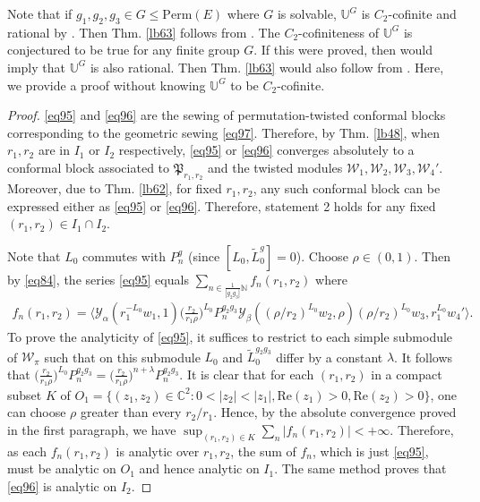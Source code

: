\documentclass[11pt,b5paper,notitlepage]{article}
\theoremstyle{definition}
\theoremstyle{plain}
\newcommand{\fk}{\mathfrak}
\newcommand{\mc}{\mathcal}
\newcommand{\wtd}{\widetilde}
\newcommand{\bk}[1]{\langle {#1}\rangle}
\newcommand{\Ubb}{\mathbb U}
\newcommand{\Cbb}{\mathbb C}
\newcommand{\Nbb}{\mathbb N}
\newcommand{\Perm}{\mathrm{Perm}}
\numberwithin{equation}{subsection}
\begin{document}
Note that if $g_1,g_2,g_3\in G\leq\Perm(E)$ where $G$ is solvable, $\Ubb^G$ is $C_2$-cofinite and rational by \cite{Miy15,CM16}. Then Thm. \ref{lb63} follows from \cite{McR21}.  The $C_2$-cofiniteness  of $\Ubb^G$ is conjectured to be true for any finite group $G$. If this were proved, then \cite{McR21} would imply that $\Ubb^G$ is also rational. Then Thm. \ref{lb63} would also follow from \cite{McR21}. Here, we provide a proof without knowing $\Ubb^G$ to be $C_2$-cofinite.



\begin{proof}
\eqref{eq95} and \eqref{eq96} are the sewing of permutation-twisted conformal blocks corresponding to the geometric sewing \eqref{eq97}. Therefore, by Thm. \ref{lb48}, when $r_1,r_2$ are in $I_1$ or $I_2$ respectively, \eqref{eq95} or \eqref{eq96} converges absolutely to a conformal block associated to $\fk P_{r_1,r_2}$ and the twisted modules $\mc W_1,\mc W_2,\mc W_3,\mc W_4'$. Moreover, due to Thm. \ref{lb62}, for fixed $r_1,r_2$, any such conformal block can be expressed either as \eqref{eq95} or \eqref{eq96}. Therefore, statement 2 holds for any fixed $(r_1,r_2)\in I_1\cap I_2$.

Note that $L_0$ commutes with $P_n^g$ (since $[L_0,\wtd L_0^g]=0$). Choose $\rho\in (0,1)$. Then by \eqref{eq84}, the series \eqref{eq95} equals $\sum_{n\in\frac 1{|g_2g_3|}\Nbb}f_n(r_1,r_2)$ where
\begin{align*}
f_n(r_1,r_2)=\bk{\mc Y_\alpha(r_1^{-L_0}w_1,1)\Big(\frac{r_2}{r_1\rho}\Big)^{L_0}P_n^{g_2g_3}\mc Y_\beta((\rho/r_2)^{L_0}w_2,\rho)(\rho/r_2)^{L_0}w_3,r_1^{L_0}w_4'}.
\end{align*}
To prove the analyticity of \eqref{eq95}, it suffices to restrict to each simple submodule of $\mc W_\pi$ such that  on this submodule $L_0$ and $\wtd L_0^{g_2g_3}$ differ by a constant $\lambda$. It follows that $\big(\frac{r_2}{r_1\rho}\Big)^{L_0}P_n^{g_2g_3}=\big(\frac{r_2}{r_1\rho}\Big)^{n+\lambda}P_n^{g_2g_3}$. It is clear that for each $(r_1,r_2)$ in a compact subset $K$ of $O_1=\{(z_1,z_2)\in\Cbb^2:0<|z_2|<|z_1|,\mathrm{Re}(z_1)>0,\mathrm{Re}(z_2)>0\}$, one can choose $\rho$ greater than every $r_2/r_1$. Hence, by the absolute convergence proved in the first paragraph, we have $\sup_{(r_1,r_2)\in K}\sum_n |f_n(r_1,r_2)|<+\infty$. Therefore, as each $f_n(r_1,r_2)$ is analytic over $r_1,r_2$, the sum of $f_n$, which is just \eqref{eq95}, must be analytic on $O_1$ and hence analytic on $I_1$. The same method proves that \eqref{eq96} is analytic on $I_2$.


\end{proof}
\end{document}
